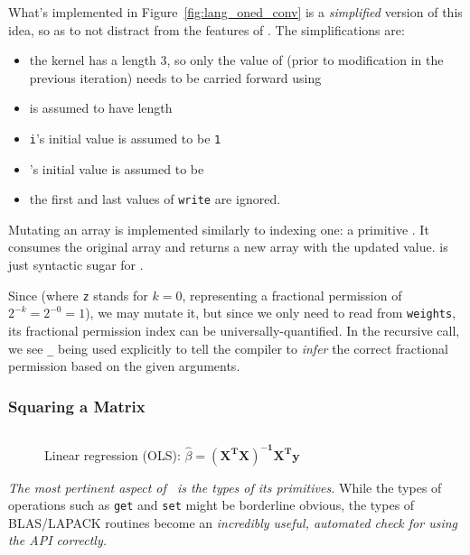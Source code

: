What's implemented in Figure~\ref{fig:lang_oned_conv} is a \emph{simplified}
version of this idea, so as to not distract from the features of \lang. The
simplifications are:
\begin{itemize}
    \item the kernel has a length 3, so only the value of 
        (prior to modification in the previous iteration) needs to be carried
        forward using 
    \item {} is assumed to have length 
    \item \texttt{i}'s initial value is assumed to be \texttt{1}
    \item {}'s initial value is assumed to be 
    \item the first and last values of \texttt{write} are ignored.
\end{itemize}

Mutating an array is implemented similarly to indexing one: a primitive
.  It consumes the original
array and returns a new array with the updated value.   is just syntactic sugar for .

Since  (where \texttt{z} stands for $k=0$, representing a
fractional permission of $2^{-k} = 2^{-0} = 1$), we may mutate it, but since we
only need to read from \texttt{weights}, its fractional permission index can be
universally-quantified. In the recursive call, we see \texttt{\_} being used
explicitly to tell the compiler to \emph{infer} the correct fractional
permission based on the given arguments.

\subsubsection{Squaring a Matrix}

\begin{figure}[t]
    \centering
    \inputminted[fontsize=\small]{ocaml}{../../examples/square.lt}
    \caption{Linear regression (OLS): $\hat\beta =
        \mathbf{(X^T X)^{-1} X^T y}$}\label{fig:lang_square}
\end{figure}

\emph{The most pertinent aspect of \lang\ is the types of its primitives.}
While the types of operations such as \texttt{get} and \texttt{set} might be
borderline obvious, the types of BLAS/LAPACK routines become an
\emph{incredibly useful, automated check for using the API correctly.}

